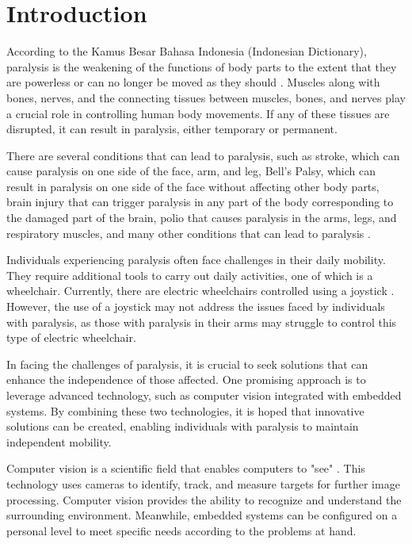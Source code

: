 \section{Introduction}
\label{sec:pendahuluan}


According to the Kamus Besar Bahasa Indonesia (Indonesian Dictionary), paralysis is the weakening of the functions of body parts to the extent that they are powerless or can no longer be moved as they should \cite{Daring_2016}. Muscles along with bones, nerves, and the connecting tissues between muscles, bones, and nerves play a crucial role in controlling human body movements. If any of these tissues are disrupted, it can result in paralysis, either temporary or permanent.

There are several conditions that can lead to paralysis, such as stroke, which can cause paralysis on one side of the face, arm, and leg, Bell's Palsy, which can result in paralysis on one side of the face without affecting other body parts, brain injury that can trigger paralysis in any part of the body corresponding to the damaged part of the brain, polio that causes paralysis in the arms, legs, and respiratory muscles, and many other conditions that can lead to paralysis \cite{Pansawira_2022}.

Individuals experiencing paralysis often face challenges in their daily mobility. They require additional tools to carry out daily activities, one of which is a wheelchair. Currently, there are electric wheelchairs controlled using a joystick \cite{choi2019motion}. However, the use of a joystick may not address the issues faced by individuals with paralysis, as those with paralysis in their arms may struggle to control this type of electric wheelchair.

In facing the challenges of paralysis, it is crucial to seek solutions that can enhance the independence of those affected. One promising approach is to leverage advanced technology, such as computer vision integrated with embedded systems. By combining these two technologies, it is hoped that innovative solutions can be created, enabling individuals with paralysis to maintain independent mobility.

Computer vision is a scientific field that enables computers to "see" \cite{TIAN20201}. This technology uses cameras to identify, track, and measure targets for further image processing. Computer vision provides the ability to recognize and understand the surrounding environment. Meanwhile, embedded systems can be configured on a personal level to meet specific needs according to the problems at hand. 

